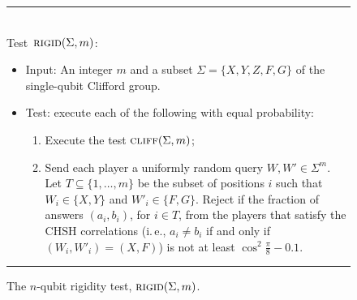\documentclass[11pt]{article}
\numberwithin{equation}{section}
\theoremstyle{definition}
\theoremstyle{plain}
\newcommand{\ie}{i.\,e.}
\newcommand{\rigid}{\textsc{rigid}}
\newcommand{\cliff}{\textsc{cliff}}
\begin{document}
\begin{figure}[H]
\rule[1ex]{\textwidth}{0.5pt}\\
Test~$\rigid(\Sigma,m)$:
\begin{itemize}
    \item Input: An integer $m$ and a subset $\Sigma = \{X,Y,Z,F,G\}$ of the single-qubit Clifford group. 
    \item Test: execute each of the following with equal probability:
\begin{enumerate}
\item[(a)] Execute the test $\cliff(\Sigma,m)$;
\item[(b)] Send each player a uniformly random query $W,W'\in \Sigma^m$. Let $T \subseteq \{1,\ldots,m\}$ be the subset of positions $i$ such that $W_i \in \{X,Y\}$ and $W'_i\in\{F,G\}$. Reject if the fraction of answers $(a_i,b_i)$, for $i\in T$, from the players that satisfy the CHSH correlations (\ie, $a_i\neq b_i$ if and only if $(W_i,W'_i)=(X,F)$) is not at least $\cos^2 \frac{\pi}{8} - 0.1$.
\end{enumerate}
\end{itemize}
\rule[2ex]{\textwidth}{0.5pt}\vspace{-.5cm}
\caption{The $n$-qubit rigidity test, $\rigid(\Sigma,m)$.}
\label{fig:rigid}
\end{figure}
\end{document}
